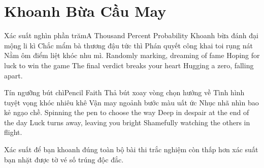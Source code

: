 \chapter{Khoanh Bừa Cầu May}

\begin{tutuyetbox}{Xác suất nghìn phần trăm}{A Thousand Percent Probability}
Khoanh bừa đánh đại mộng li kì
Chắc mẩm bà thương đậu tức thì
Phán quyết công khai toi rụng nát
Nằm ôm điểm liệt khóc nhu mì.
\tcblower
Randomly marking, dreaming of fame 
Hoping for luck to win the game 
The final verdict breaks your heart 
Hugging a zero, falling apart.
\end{tutuyetbox}

\begin{tutuyetbox}{Tín ngưỡng bút chì}{Pencil Faith}
Thả bút xoay vòng chọn hướng về
Tình hình tuyệt vọng khóc nhiêu khê 
Vận may ngoảnh bước màu uất ức
Nhục nhã nhìn bao kẻ ngạo chề.
\tcblower
Spinning the pen to choose the way 
Deep in despair at the end of the day 
Luck turns away, leaving you bright 
Shamefully watching the others in flight.
\end{tutuyetbox}

\begin{ghichu}
Xác suất để bạn khoanh đúng toàn bộ bài thi trắc nghiệm còn thấp hơn xác suất bạn nhặt được tờ vé số trúng độc đắc.
\end{ghichu}
